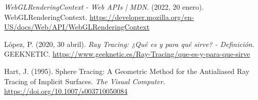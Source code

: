 \begin{thebibliography}{99}
 \textit{WebGLRenderingContext - Web APIs | MDN}. (2022, 20 enero). WebGLRenderingContext. \url{https://developer.mozilla.org/en-US/docs/Web/API/WebGLRenderingContext}

 López, P. (2020, 30 abril). \textit{Ray Tracing: ¿Qué es y para qué sirve? - Definición}. GEEKNETIC. \url{https://www.geeknetic.es/Ray-Tracing/que-es-y-para-que-sirve}

 Hart, J. (1995). Sphere Tracing: A Geometric Method for the Antialiased Ray Tracing of Implicit Surfaces. \textit{The Visual Computer}. \url{https://doi.org/10.1007/s003710050084}

\end{thebibliography}
